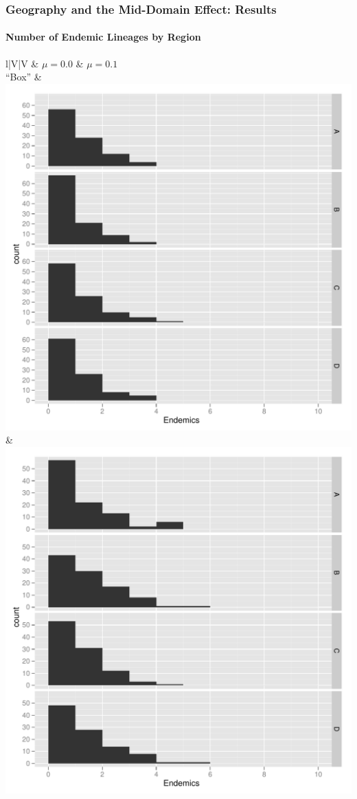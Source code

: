 \documentclass[11pt,t]{beamer}
\begin{document}
\begin{frame}
	\frametitle{Geography and the Mid-Domain Effect: Results}
	\framesubtitle{Number of Endemic Lineages by Region}
\begin{center}
\begin{tabular}{l|V|V}
			& $\mu=0.0$ & $\mu=0.1$ \\
\hline			
``Box''		& \includegraphics[scale=0.15]{results-endemics-box-d0.pdf}		  &  \includegraphics[scale=0.15]{results-endemics-box-d1.pdf}  	\\

\end{tabular}
\end{center}
\end{frame}
\end{document}
